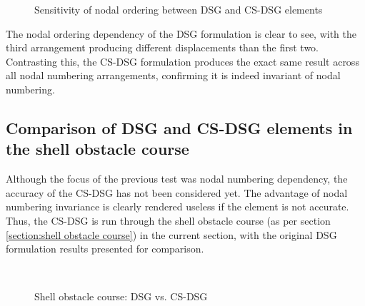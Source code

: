 \begin{figure}[H]
	\caption{\label{csdsg_nodal_ordering}Sensitivity of nodal ordering between DSG and CS-DSG elements}
\end{figure}

The nodal ordering dependency of the DSG formulation is clear to see, with the third arrangement producing different displacements than the first two. Contrasting this, the CS-DSG formulation produces the exact same result across all nodal numbering arrangements, confirming it is indeed invariant of nodal numbering.

\subsection{Comparison of DSG and CS-DSG elements in the shell obstacle course}
Although the focus of the previous test was nodal numbering dependency, the accuracy of the CS-DSG has not been considered yet. The advantage of nodal numbering invariance is clearly rendered useless if the element is not accurate. Thus, the CS-DSG is run through the shell obstacle course (as per section \ref{section:shell obstacle course}) in the current section, with the original DSG formulation results presented for comparison.

\begin{figure}[H]
	\\
	\caption{\label{csdsg_shell_obstacl}Shell obstacle course: DSG vs. CS-DSG}
\end{figure}

